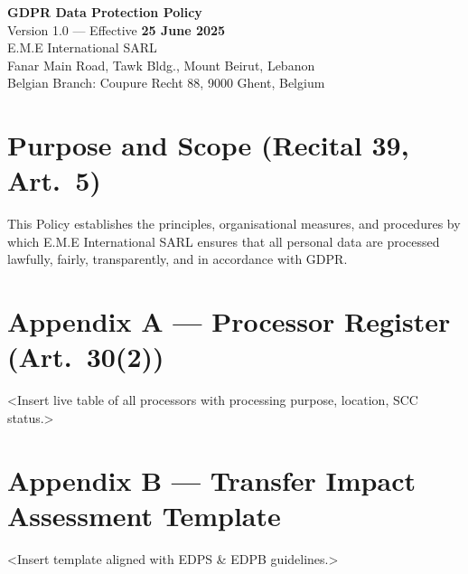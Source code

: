 \documentclass[11pt,a4paper]{article}
\newcommand{\EME}{E.M.E International SARL}
\begin{document}
\onehalfspacing

\begin{center}
  \vspace*{2cm}
  {\Huge\bfseries GDPR Data Protection Policy}\\[1em]
  Version 1.0 — Effective \textbf{25 June 2025}\\[2.5em]
  \EME\\[0.4em]
  Fanar Main Road, Tawk Bldg., Mount Beirut, Lebanon\\
  Belgian Branch: Coupure Recht 88, 9000 Ghent, Belgium\\[0.5em]
\end{center}
\clearpage

\tableofcontents
\clearpage

\section{Purpose and Scope \small(Recital 39, Art.~5)}
This Policy establishes the principles, organisational measures, and procedures by which \EME{} ensures that all personal data are processed lawfully, fairly, transparently, and in accordance with GDPR.


\appendix
\section*{Appendix A — Processor Register (Art.~30(2))}
\textless Insert live table of all processors with processing purpose, location, SCC status.\textgreater

\section*{Appendix B — Transfer Impact Assessment Template}
\textless Insert template aligned with EDPS \& EDPB guidelines.\textgreater
\end{document}
